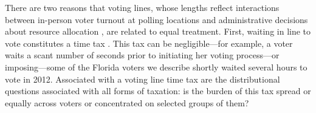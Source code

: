 \documentclass[12pt,titlepage]{article}
\begin{document}









There are two reasons that voting lines, whose lengths reflect
interactions between in-person voter turnout at polling locations and
administrative decisions about resource allocation
\citep{herronsmith:hanoverstudy}, are related to equal treatment.
First, waiting in line to vote constitutes a time tax
\citep{mukherjee:timetax}. This tax can be negligible---for example, a
voter waits a scant number of seconds prior to initiating her voting
process---or imposing---some of the Florida voters we describe shortly
waited several hours to vote in 2012. Associated with a voting line
time tax are the distributional questions associated with all forms of
taxation: is the burden of this tax spread or equally across voters or
concentrated on selected groups of them?
\end{document}
